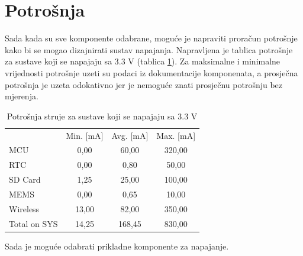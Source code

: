 \section{Potrošnja}

Sada kada su sve komponente odabrane, moguće je napraviti proračun potrošnje kako bi se mogao dizajnirati sustav napajanja. Napravljena je tablica potrošnje za sustave koji se napajaju sa 3.3 V (tablica \ref{tab:MB3V3}). Za maksimalne i minimalne vrijednosti potrošnje uzeti su podaci iz dokumentacije komponenata, a prosječna potrošnja je uzeta odokativno jer je nemoguće znati prosječnu potrošnju bez mjerenja.
\begin{table}[htbp]
    \centering
    \caption{Potrošnja struje za sustave koji se napajaju sa 3.3 V}
    \begin{tabular}{lccc} \hline
           & Min. [mA] & Avg. [mA] & Max. [mA] \\
      MCU  & 0,00 & 60,00 & 320,00 \\
      RTC  & 0,00 & 0,80 & 50,00 \\
      SD Card & 1,25 & 25,00 & 100,00 \\
      MEMS & 0,00 & 0,65 & 10,00 \\
      Wireless & 13,00 & 82,00 & 350,00 \\ \hline
      Total on SYS & 14,25 & 168,45 & 830,00 \\ \hline
    \end{tabular}%
    \label{tab:MB3V3}%
\end{table}%
Sada je moguće odabrati prikladne komponente za napajanje.

